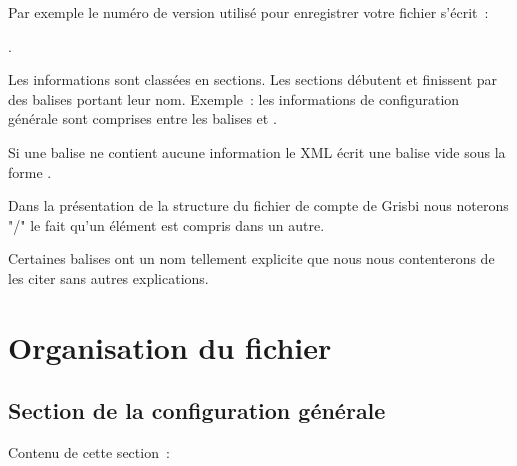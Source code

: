 Par exemple le numéro de version utilisé pour enregistrer votre fichier s'écrit~:

 .

Les informations sont classées en sections. Les sections débutent et finissent 
par des balises portant leur nom. Exemple~: les informations de configuration 
générale sont comprises entre les balises  et 
.

Si une balise ne contient aucune information le XML écrit une balise
vide sous la forme .

Dans la présentation de la structure du fichier de compte de Grisbi nous 
noterons "/" le fait qu'un élément est compris dans un autre.

Certaines balises ont un nom tellement explicite que nous nous contenterons de 
les citer sans autres explications.

\section{Organisation du fichier}

\subsection{Section de la configuration générale\label{xml-setup}}

Contenu de cette section~:

